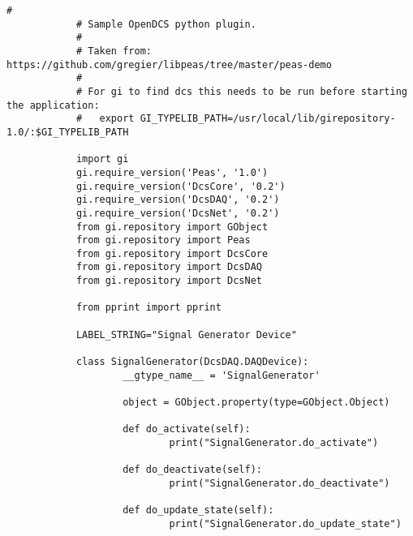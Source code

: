     \begin{lstlisting}[caption={Minimal Working Example of a libpeas Plugin},
                       label={lst:inst-plugin-example}]
			#
			# Sample OpenDCS python plugin.
			#
			# Taken from: https://github.com/gregier/libpeas/tree/master/peas-demo
			#
			# For gi to find dcs this needs to be run before starting the application:
			#   export GI_TYPELIB_PATH=/usr/local/lib/girepository-1.0/:$GI_TYPELIB_PATH

			import gi
			gi.require_version('Peas', '1.0')
			gi.require_version('DcsCore', '0.2')
			gi.require_version('DcsDAQ', '0.2')
			gi.require_version('DcsNet', '0.2')
			from gi.repository import GObject
			from gi.repository import Peas
			from gi.repository import DcsCore
			from gi.repository import DcsDAQ
			from gi.repository import DcsNet

			from pprint import pprint

			LABEL_STRING="Signal Generator Device"

			class SignalGenerator(DcsDAQ.DAQDevice):
					__gtype_name__ = 'SignalGenerator'

					object = GObject.property(type=GObject.Object)

					def do_activate(self):
							print("SignalGenerator.do_activate")

					def do_deactivate(self):
							print("SignalGenerator.do_deactivate")

					def do_update_state(self):
							print("SignalGenerator.do_update_state")
    \end{lstlisting}
